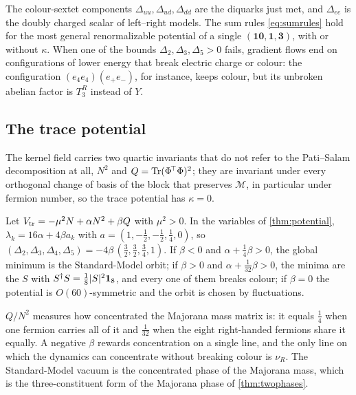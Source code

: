 The colour-sextet components $\Delta_{uu},\Delta_{ud},\Delta_{dd}$ are the diquarks just met, and $\Delta_{ee}$ is the doubly charged scalar of left--right models.
The sum rules \eqref{eq:sumrules} hold for the most general renormalizable potential of a single $(\mathbf{10},\mathbf1,\mathbf3)$, with or without $\kappa$. When one of the
bounds $\Delta_2,\Delta_3,\Delta_5>0$ fails, gradient flows end on configurations of lower energy that break electric charge or colour: the configuration
$(e_4e_4)(e_+e_-)$, for instance, keeps colour, but its unbroken abelian factor is $T^R_3$ instead of $Y$.

\subsection{The trace potential}

The kernel field carries two quartic invariants that do not refer to the Pati--Salam decomposition at all, $N^2$ and $Q=\operatorname{Tr}(\Phi^{\!\top}\Phi)^2$; they are
invariant under every orthogonal change of basis of the block that preserves $\mathcal M$, in particular under fermion number, so the trace potential has
$\kappa=0$.

\begin{theorem}
\label{thm:tracepot}
Let $V_{\rm tr}=-\mu^2N+\alpha N^2+\beta Q$ with $\mu^2>0$. In the variables of \cref{thm:potential}, $\lambda_k=16\alpha+4\beta a_k$ with $a=(1,-\tfrac12,-\tfrac12,\tfrac14,0)$,
so $(\Delta_2,\Delta_3,\Delta_4,\Delta_5)=-4\beta\,(\tfrac32,\tfrac32,\tfrac34,1)$. If $\beta<0$ and $\alpha+\tfrac14\beta>0$, the global minimum is the Standard-Model orbit; if
$\beta>0$ and $\alpha+\tfrac1{32}\beta>0$, the minima are the $S$ with $S^\dagger S=\tfrac18|S|^2\mathbf 1_8$, and every one of them breaks colour; if $\beta=0$ the potential is
$O(60)$-symmetric and the orbit is chosen by fluctuations.
\end{theorem}

$Q/N^2$ measures how concentrated the Majorana mass matrix is: it equals $\tfrac14$ when one fermion carries all of it and $\tfrac1{32}$ when the eight
right-handed fermions share it equally. A negative $\beta$ rewards concentration on a single line, and the only line on which the dynamics can concentrate
without breaking colour is $\nu_R$. The Standard-Model vacuum is the concentrated phase of the Majorana mass, which is the three-constituent form of
the Majorana phase of \cref{thm:twophases}.

